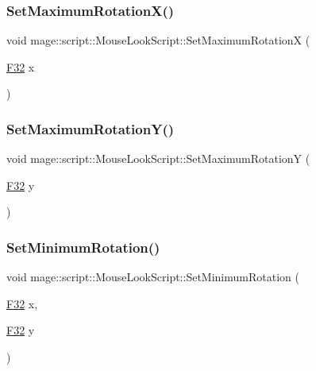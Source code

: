 \subsubsection{\texorpdfstring{Set\+Maximum\+Rotation\+X()}{SetMaximumRotationX()}}
{\footnotesize\ttfamily void mage\+::script\+::\+Mouse\+Look\+Script\+::\+Set\+Maximum\+RotationX (\begin{DoxyParamCaption}\item[{\hyperlink{namespacemage_aa97e833b45f06d60a0a9c4fc22ae02c0}{F32}}]{x }\end{DoxyParamCaption})\hspace{0.3cm}{\ttfamily [noexcept]}}

\hypertarget{classmage_1_1script_1_1_mouse_look_script_af56c4be26dde7497d53bb9f48d1b1a55}{}\label{classmage_1_1script_1_1_mouse_look_script_af56c4be26dde7497d53bb9f48d1b1a55} 
\subsubsection{\texorpdfstring{Set\+Maximum\+Rotation\+Y()}{SetMaximumRotationY()}}
{\footnotesize\ttfamily void mage\+::script\+::\+Mouse\+Look\+Script\+::\+Set\+Maximum\+RotationY (\begin{DoxyParamCaption}\item[{\hyperlink{namespacemage_aa97e833b45f06d60a0a9c4fc22ae02c0}{F32}}]{y }\end{DoxyParamCaption})\hspace{0.3cm}{\ttfamily [noexcept]}}

\hypertarget{classmage_1_1script_1_1_mouse_look_script_a6964af9c1c264be02c37671019ab117f}{}\label{classmage_1_1script_1_1_mouse_look_script_a6964af9c1c264be02c37671019ab117f} 
\subsubsection{\texorpdfstring{Set\+Minimum\+Rotation()}{SetMinimumRotation()}\hspace{0.1cm}{\footnotesize\ttfamily [1/3]}}
{\footnotesize\ttfamily void mage\+::script\+::\+Mouse\+Look\+Script\+::\+Set\+Minimum\+Rotation (\begin{DoxyParamCaption}\item[{\hyperlink{namespacemage_aa97e833b45f06d60a0a9c4fc22ae02c0}{F32}}]{x,  }\item[{\hyperlink{namespacemage_aa97e833b45f06d60a0a9c4fc22ae02c0}{F32}}]{y }\end{DoxyParamCaption})\hspace{0.3cm}{\ttfamily [noexcept]}}

